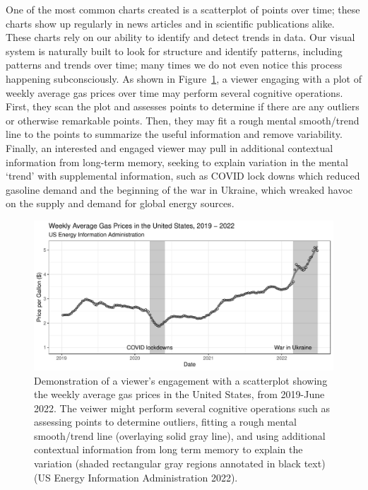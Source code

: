 \documentclass[
]{jds}
\begin{document}
One of the most common charts created is a scatterplot of points over
time; these charts show up regularly in news articles and in scientific
publications alike. These charts rely on our ability to identify and
detect trends in data. Our visual system is naturally built to look for
structure and identify patterns, including patterns and trends over
time; many times we do not even notice this process happening
subconsciously. As shown in Figure~\ref{fig-gas-prices}, a viewer
engaging with a plot of weekly average gas prices over time may perform
several cognitive operations. First, they scan the plot and assesses
points to determine if there are any outliers or otherwise remarkable
points. Then, they may fit a rough mental smooth/trend line to the
points to summarize the useful information and remove variability.
Finally, an interested and engaged viewer may pull in additional
contextual information from long-term memory, seeking to explain
variation in the mental `trend' with supplemental information, such as
COVID lock downs which reduced gasoline demand and the beginning of the
war in Ukraine, which wreaked havoc on the supply and demand for global
energy sources.

\begin{figure}

{\centering \includegraphics{./images/fig-gas-prices-1.pdf}

}

\caption{\label{fig-gas-prices}Demonstration of a viewer's engagement
with a scatterplot showing the weekly average gas prices in the United
States, from 2019-June 2022. The veiwer might perform several cognitive
operations such as assessing points to determine outliers, fitting a
rough mental smooth/trend line (overlaying solid gray line), and using
additional contextual information from long term memory to explain the
variation (shaded rectangular gray regions annotated in black text) (US
Energy Information Administration 2022).}

\end{figure}
\end{document}
